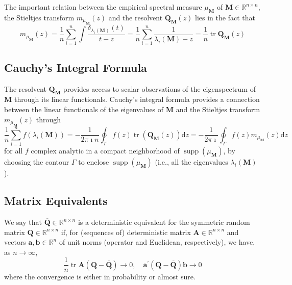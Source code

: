 \begin{remark}
    The important relation between the empirical spectral measure $\mu_{\mathbf{M}}$ of $\mathbf{M}\in\mathbb{R}^{n\times n}$, the Stieltjes transform $m_{\mu_{\mathbf{M}}}(z)$ and the resolvent $\mathbf{Q}_{\mathbf{M}}(z)$ lies in the fact that
    \begin{equation} \label{eq:relation-between-empirical-spectral-measures-stieltjes-transform-and-its-resolvent}
        m_{\mu_{\mathbf{M}}}(z)=\frac{1}{n}\sum_{i=1}^{n}\int\frac{\delta_{\lambda_{i}(\mathbf{M})}(t)}{t-z}=\frac{1}{n}\sum_{i=1}^{n}\frac{1}{\lambda_{i}(\mathbf{M})-z}=\frac{1}{n}\operatorname{tr}\mathbf{Q}_{\mathbf{M}}(z)
    \end{equation}
\end{remark}

\subsection*{Cauchy’s Integral Formula}

The resolvent $\mathbf{Q}_{\mathbf{M}}$ provides access to scalar observations of the eigenspectrum of $\mathbf{M}$ through its linear functionals. Cauchy’s integral formula provides a connection between the linear functionals of the eigenvalues of $\mathbf{M}$ and the Stieltjes transform $m_{\mu_{\mathbf{M}}}(z)$ through
\begin{equation}
    \frac{1}{n}\sum_{i=1}^{n}f\left(\lambda_{i}(\mathbf{M})\right)=-\frac{1}{2\pi\imath n}\oint_{\Gamma}f(z)\operatorname{tr}\left(\mathbf{Q}_{\mathbf{M}}(z)\right)\mathrm{d}z=-\frac{1}{2\pi\imath }\oint_{\Gamma}f(z)m_{\mu_{\mathbf{M}}}(z)\mathrm{d}z
\end{equation}
for all $f$ complex analytic in a compact neighborhood of $\operatorname{supp}\left(\mu_{\mathbf{M}}\right)$, by choosing the contour $\Gamma$ to enclose $\operatorname{supp}\left(\mu_{\mathbf{M}}\right)$ (i.e., all the eigenvalues $\lambda_{i}(\mathbf{M})$).

\subsection*{Matrix Equivalents}

\begin{definition}
    We say that $\overline{\mathbf{Q}} \in \mathbb{R}^{n \times n}$ is a deterministic equivalent for the symmetric random matrix $\mathbf{Q} \in \mathbb{R}^{n \times n}$ if, for (sequences of) deterministic matrix $\mathbf{A} \in \mathbb{R}^{n \times n}$ and vectors $\mathbf{a}, \mathbf{b} \in \mathbb{R}^{n}$ of unit norms (operator and Euclidean, respectively), we have, as $n \rightarrow \infty$,
    $$
        \frac{1}{n} \operatorname{tr} \mathbf{A}(\mathbf{Q}-\overline{\mathbf{Q}}) \rightarrow 0, \quad \mathbf{a}^{\prime}(\mathbf{Q}-\overline{\mathbf{Q}}) \mathbf{b} \rightarrow 0
    $$
    where the convergence is either in probability or almost sure.
\end{definition}

